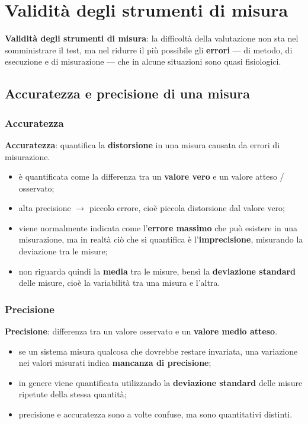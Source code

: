 \chapter{Validità degli strumenti di misura}

\textbf{Validità degli strumenti di misura}: la difficoltà della valutazione non sta nel
somministrare il test, ma nel ridurre il più possibile gli \textbf{errori} --- di metodo, di
esecuzione e di misurazione --- che in alcune situazioni sono quasi fisiologici.

\section{Accuratezza e precisione di una misura}

\subsection{Accuratezza}

\textbf{Accuratezza}: quantifica la \textbf{distorsione} in una misura causata da errori di
misurazione.

\begin{itemize}
  \item è quantificata come la differenza tra un \textbf{valore vero} e un valore atteso /
    osservato;
  \item alta precisione $\rightarrow$ piccolo errore, cioè piccola distorsione dal valore vero;
  \item viene normalmente indicata come l'\textbf{errore massimo} che può esistere in una
    misurazione, ma in realtà ciò che si quantifica è l'\textbf{imprecisione}, misurando la
    deviazione tra le misure;
  \item non riguarda quindi la \textbf{media} tra le misure, bensì la \textbf{deviazione standard}
    delle misure, cioè la variabilità tra una misura e l'altra.
\end{itemize}

\subsection{Precisione}

\textbf{Precisione}: differenza tra un valore osservato e un \textbf{valore medio atteso}.

\begin{itemize}
  \item se un sistema misura qualcosa che dovrebbe restare invariata, una variazione nei valori
    misurati indica \textbf{mancanza di precisione};
  \item in genere viene quantificata utilizzando la \textbf{deviazione standard} delle misure
    ripetute della stessa quantità;
  \item precisione e accuratezza sono a volte confuse, ma sono quantitativi distinti.
\end{itemize}

